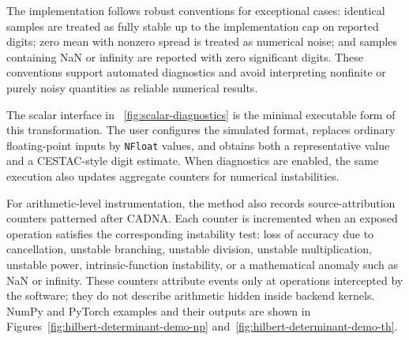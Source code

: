 \documentclass[manuscript, screen]{acmart}
\begin{document}
The implementation follows robust conventions for exceptional cases: identical samples are treated as fully stable up to the implementation cap on reported digits; zero mean with nonzero spread is treated as numerical noise; and samples containing NaN or infinity are reported with zero significant digits. These conventions support automated diagnostics and avoid interpreting nonfinite or purely noisy quantities as reliable numerical results.

The scalar interface in \figurename~\ref{fig:scalar-diagnostics} is the minimal executable form of this transformation. The user configures the simulated format, replaces ordinary floating-point inputs by \texttt{NFloat} values, and obtains both a representative value and a CESTAC-style digit estimate. When diagnostics are enabled, the same execution also updates aggregate counters for numerical instabilities.


For arithmetic-level instrumentation, the method also records source-attribution counters patterned after CADNA. Each counter is incremented when an exposed operation satisfies the corresponding instability test: loss of accuracy due to cancellation, unstable branching, unstable division, unstable multiplication, unstable power, intrinsic-function instability, or a mathematical anomaly such as NaN or infinity. These counters attribute events only at operations intercepted by the software; they do not describe arithmetic hidden inside backend kernels. NumPy and PyTorch examples and their outputs are shown in Figures~\ref{fig:hilbert-determinant-demo-np} and~\ref{fig:hilbert-determinant-demo-th}. %
\end{document}
